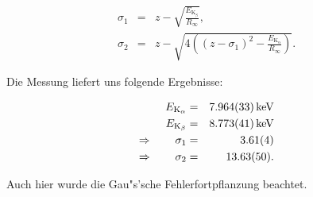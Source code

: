 		\begin{eqnarray}
			\sigma_1 & = & z - \sqrt{\frac{E_\mathrm{K_\beta}}{R_\infty}} , \\
			\sigma_2 & = & z - \sqrt{4\left(\left( z - \sigma_1 \right)^2 - \frac{E_\mathrm{K_\alpha}}{R_\infty} \right)} .
		\end{eqnarray}

		Die Messung liefert uns folgende Ergebnisse:

		\begin{eqnarray}
			E_\mathrm{K_\alpha} & = & \SI{7.964 (33)}{\kilo \electronvolt} \\
			E_\mathrm{K_\beta} & = & \SI{8.773 (41)}{\kilo \electronvolt} \\
			\Rightarrow \qquad \sigma_1 & = & \SI{3.61 (4)}{} \nonumber \\
			\Rightarrow \qquad \sigma_2 & = & \SI{13.63 (50)}{} . \nonumber
		\end{eqnarray}

		Auch hier wurde die Gau"s'sche Fehlerfortpflanzung beachtet.